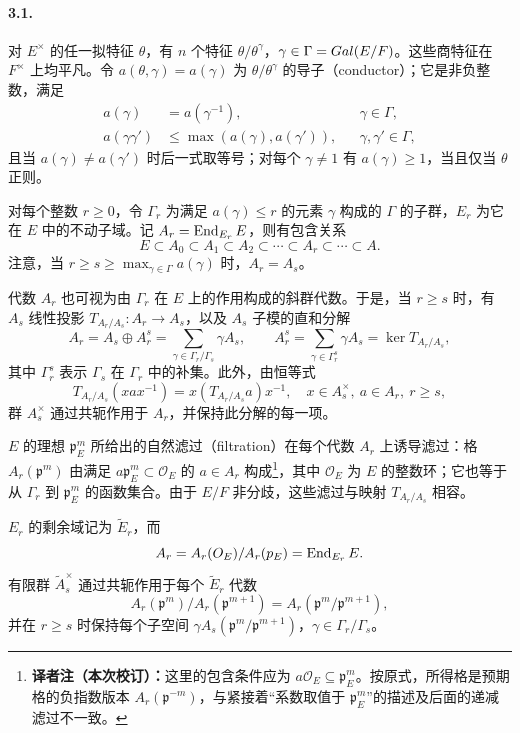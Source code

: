 \paragraph*{3.1.}对 $E^\times$ 的任一拟特征 $\theta$，有 $n$ 个特征 $\theta/\theta^\gamma$，$\gamma\in\Gamma=Gal(E/F)$。这些商特征在 $F^\times$ 上均平凡。令 $a(\theta,\gamma)=a(\gamma)$ 为 $\theta/\theta^\gamma$ 的导子（conductor）；它是非负整数，满足
\[
\begin{aligned}
a(\gamma)&=a(\gamma^{-1}),&&\gamma\in\Gamma,\\
a(\gamma\gamma')&\leq\max(a(\gamma),a(\gamma')),&&\gamma,\gamma'\in\Gamma,
\end{aligned}
\]
且当 $a(\gamma)\ne a(\gamma')$ 时后一式取等号；对每个 $\gamma\ne1$ 有 $a(\gamma)\geq1$，当且仅当 $\theta$ 正则。

对每个整数 $r\geq0$，令 $\Gamma_r$ 为满足 $a(\gamma)\leq r$ 的元素 $\gamma$ 构成的 $\Gamma$ 的子群，$E_r$ 为它在 $E$ 中的不动子域。记 $A_r=\operatorname{End}_{E_r}E$，则有包含关系
\[
E\subset A_0\subset A_1\subset A_2\subset\cdots\subset A_r\subset\cdots\subset A.
\]
注意，当 $r\geq s\geq\max_{\gamma\in\Gamma}a(\gamma)$ 时，$A_r=A_s$。

代数 $A_r$ 也可视为由 $\Gamma_r$ 在 $E$ 上的作用构成的斜群代数。于是，当 $r\geq s$ 时，有 $A_s$ 线性投影 $T_{A_r/A_s}:A_r\to A_s$，以及 $A_s$ 子模的直和分解
\[
A_r=A_s\oplus A_r^s=\sum_{\gamma\in\Gamma_r/\Gamma_s}\gamma A_s,\qquad
A_r^s=\sum_{\gamma\in\Gamma_r^s}\gamma A_s=\ker T_{A_r/A_s},
\]
其中 $\Gamma_r^s$ 表示 $\Gamma_s$ 在 $\Gamma_r$ 中的补集。此外，由恒等式
\[
T_{A_r/A_s}(xax^{-1})=x(T_{A_r/A_s}a)x^{-1},\quad x\in A_s^\times,\ a\in A_r,\ r\geq s,
\]
群 $A_s^\times$ 通过共轭作用于 $A_r$，并保持此分解的每一项。

$E$ 的理想 $\mathfrak p_E^m$ 所给出的自然滤过（filtration）在每个代数 $A_r$ 上诱导滤过：格 $A_r(\mathfrak p^m)$ 由满足 $a\mathfrak p_E^m\subset\mathcal O_E$ 的 $a\in A_r$ 构成\footnote{\textbf{译者注（本次校订）：}这里的包含条件应为 $a\mathcal O_E\subseteq\mathfrak p_E^m$。按原式，所得格是预期格的负指数版本 $A_r(\mathfrak p^{-m})$，与紧接着“系数取值于 $\mathfrak p_E^m$”的描述及后面的递减滤过不一致。}，其中 $\mathcal O_E$ 为 $E$ 的整数环；它也等于从 $\Gamma_r$ 到 $\mathfrak p_E^m$ 的函数集合。由于 $E/F$ 非分歧，这些滤过与映射 $T_{A_r/A_s}$ 相容。

$E_r$ 的剩余域记为 $\widetilde E_r$，而
\[
A_r=A_r(O_E)/A_r(p_E)=\operatorname{End}_{E_r}E.
\]
有限群 $\widetilde A_s^\times$ 通过共轭作用于每个 $\widetilde E_r$ 代数
\[
A_r(\mathfrak p^m)/A_r(\mathfrak p^{m+1})=A_r(\mathfrak p^m/\mathfrak p^{m+1}),
\]
并在 $r\geq s$ 时保持每个子空间 $\gamma A_s(\mathfrak p^m/\mathfrak p^{m+1})$，$\gamma\in\Gamma_r/\Gamma_s$。
